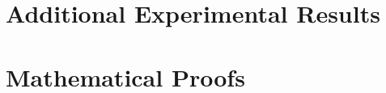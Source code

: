 \documentclass[11pt,a4paper]{article}
\begin{document}


\appendix
\section{Additional Experimental Results}
\label{app:additional_results}


\section{Mathematical Proofs}
\label{app:proofs}

\end{document}
